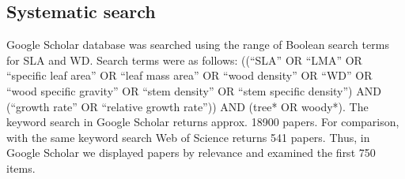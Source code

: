 \documentclass[a4paper]{article}\usepackage[]{graphicx}\usepackage[]{color}
\begin{document}
\subsection*{Systematic search}\label{systematic-search}

Google Scholar database was searched using the range of Boolean search terms for SLA and WD. Search terms were as follows: ((``SLA'' OR ``LMA'' OR ``specific leaf area'' OR ``leaf mass area'' OR ``wood density'' OR ``WD'' OR ``wood specific gravity'' OR ``stem density'' OR ``stem specific density'') AND (``growth rate'' OR ``relative growth rate'')) AND (tree* OR woody*). The keyword search in Google Scholar returns approx. 18900 papers. For comparison, with the same keyword search Web of Science returns 541 papers. Thus, in Google Scholar we displayed papers by relevance and examined the first 750 items. 
\end{document}
